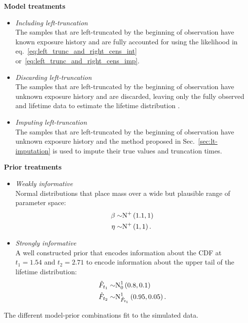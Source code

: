 \begin{table}
    \centering
    \begin{multicols}{2}
    
    \textbf{Model treatments}
    \begin{itemize}
        \item[] \emph{Including left-truncation}\\ The samples that are left-truncated by the beginning of observation have known exposure history and are fully accounted for using the likelihood in eq.~\eqref{eq:left_trunc_and_right_cens_int} or~\eqref{eq:left_trunc_and_right_cens_imp}.
        \item[] \emph{Discarding left-truncation}\\ The samples that are left-truncated by the beginning of observation have unknown exposure history and are discarded, leaving only the fully observed and lifetime data to estimate the lifetime distribution \citep{guo1993}.
        \item[] \emph{Imputing left-truncation}\\ The samples that are left-truncated by the beginning of observation have unknown exposure history and the method proposed in Sec.~\ref{sec:lt-imputation} is used to impute their true values and truncation times.
    \end{itemize}

    \columnbreak
    
    \textbf{Prior treatments}
    \begin{itemize}
        \item[] \emph{Weakly informative}\\ Normal distributions that place mass over a wide but plausible range of parameter space:
        \begin{align*}
            \beta \sim & \hbox{N}^{+}\left(1.1, 1\right)  \\
            \eta \sim & \hbox{N}^{+}\left(1, 1\right).
        \end{align*}
        \item[] \emph{Strongly informative}\\ A well constructed prior that encodes information about the CDF at $t_1 = 1.54$ and $t_2 = 2.71$ to encode information about the upper tail of the lifetime distribution:
        \begin{align*}
            \hat{F}_{t_1} \sim & \hbox{N}^{1}_{0}\left(0.8, 0.1\right)    \\
            \hat{F}_{t_2} \sim & \hbox{N}^{1}_{\hat{F}_{t_1}}\left(0.95, 0.05\right).
        \end{align*}
    \end{itemize}

    \end{multicols}
    \caption{The different model-prior combinations fit to the simulated data.}\label{tab:model-prior-comb}
\end{table}

